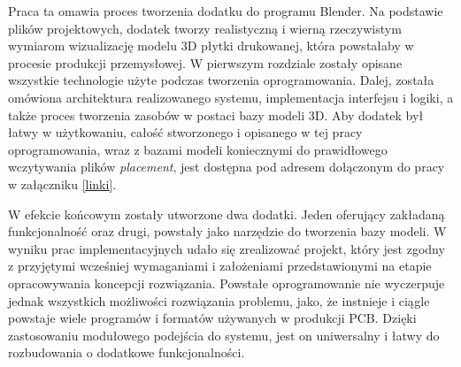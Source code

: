 \documentclass{xmgr}
\begin{document}
\summary

Praca ta omawia proces tworzenia dodatku do programu Blender. Na podstawie plików projektowych, dodatek tworzy realistyczną i wierną rzeczywistym wymiarom wizualizację modelu 3D płytki drukowanej, która powstałaby w procesie produkcji przemysłowej. W pierwszym rozdziale zostały opisane wszystkie technologie użyte podczas tworzenia oprogramowania. Dalej, została omówiona architektura realizowanego systemu, implementacja interfejsu i logiki, a także proces tworzenia zasobów w postaci bazy modeli 3D.
Aby dodatek był łatwy w użytkowaniu, całość stworzonego i opisanego w tej pracy oprogramowania, wraz z bazami modeli koniecznymi do prawidłowego wczytywania plików \emph{placement}, jest dostępna pod adresem dołączonym do pracy w załączniku \ref{linki}. 

W efekcie końcowym zostały utworzone dwa dodatki. Jeden oferujący zakładaną funkcjonalność oraz drugi, powstały jako narzędzie do tworzenia bazy modeli. W wyniku prac implementacyjnych udało się zrealizować projekt, który jest zgodny z przyjętymi wcześniej wymaganiami i założeniami przedstawionymi na etapie opracowywania koncepcji rozwiązania. Powstałe oprogramowanie nie wyczerpuje jednak wszystkich możliwości rozwiązania problemu, jako, że instnieje i ciągle powstaje wiele programów i formatów używanych w produkcji PCB. Dzięki zastosowaniu modułowego podejścia do systemu, jest on uniwersalny i łatwy do rozbudowania o dodatkowe funkcjonalności.






\listoffigures

\appendix
\end{document}

